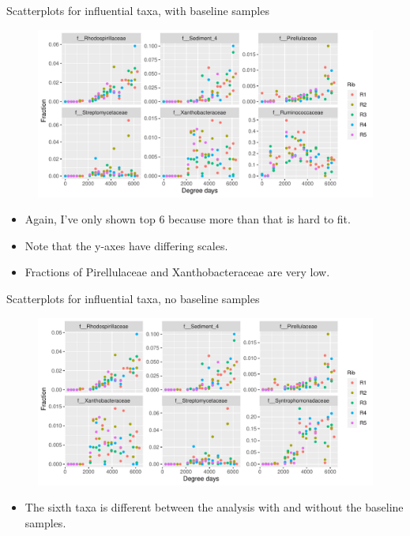\documentclass{beamer}
\begin{document}
\begin{frame}{Scatterplots for influential taxa, with baseline samples}

  \begin{center}
    \begin{figure}
      \includegraphics[width=4.75in]{RiceRivers/bacteria/use_families/w_ribs/w_baseline/infl_rib_family_w_baseline_scatter}
    \end{figure}
  \end{center}
  \vspace{-0.25in}
  {\scriptsize
  \begin{itemize}
  \item Again, I've only shown top 6 because more than that is hard to fit.
  \item Note that the y-axes have differing scales.
  \item Fractions of Pirellulaceae and Xanthobacteraceae are very low.
  \end{itemize}
  }

\end{frame}



\begin{frame}{Scatterplots for influential taxa, no baseline samples}

  \begin{center}
    \begin{figure}
      \includegraphics[width=4.75in]{RiceRivers/bacteria/use_families/w_ribs/no_baseline/infl_rib_family_no_baseline_scatter}
    \end{figure}
  \end{center}
  \vspace{-0.25in}
  {\scriptsize
  \begin{itemize}
  \item The sixth taxa is different between the analysis with and without the baseline samples.
  \end{itemize}
  }

\end{frame}
\end{document}
